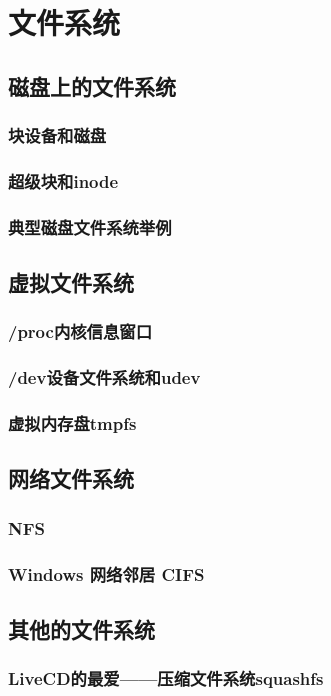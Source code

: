 \documentclass[amstex,twoside]{ctexbook}
\begin{document}
\chapter{文件系统}
\section{磁盘上的文件系统	}
\subsection{块设备和磁盘}
\subsection{超级块和inode}
\subsection{典型磁盘文件系统举例}
\section{虚拟文件系统}
\subsection{/proc内核信息窗口}
\subsection{/dev设备文件系统和udev}
\subsection{虚拟内存盘tmpfs}
\section{网络文件系统	}
\subsection{NFS}
\subsection{Windows 网络邻居 CIFS}
\section{  其他的文件系统	}
\subsection{  LiveCD的最爱——压缩文件系统squashfs}
\end{document}
